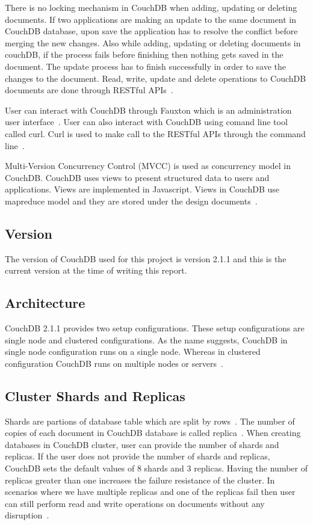 There is no locking mechanism in CouchDB when adding,
updating or deleting documents. If two applications are making an
update to the same document in CouchDB database, upon save the
application has to resolve the conflict before merging the new
changes. Also while adding, updating or deleting documents in couchDB,
if the process fails before finishing then nothing gets saved in the
document. The update process has to finish successfully in order to
save the changes to the document. Read, write, update and delete
operations to CouchDB documents are done through RESTful
APIs~\cite{www-Couchdb}. 

User can interact with CouchDB through Fauxton which is
an administration user interface~\cite{www-Couchdb}. User can also
interact with CouchDB using  comand line tool called curl. Curl is
used to make call to the RESTful APIs through the command
line~\cite{www-CouchdbCurl}. 


Multi-Version Concurrency Control (MVCC) is used as concurrency model
in CouchDB. CouchDB uses views to present structured data to users and
applications. Views are implemented in Javascript. Views in CouchDB
use mapreduce model and they are stored under the design
documents~\cite{www-Couchdb}.  

\subsection{Version}
The version of CouchDB used for this project is version 2.1.1 and this
is the current version at the time of writing this report.

\subsection{Architecture}
CouchDB 2.1.1 provides two setup configurations. These setup
configurations are single node and clustered configurations. As the
name suggests, CouchDB in single node configuration runs on a single
node. Whereas in clustered configuration CouchDB runs on multiple
nodes or servers~\cite{www-Couchdb, www-CouchdbOverview}.

\subsection{Cluster Shards and Replicas}

Shards are partions of database table which are split by
rows~\cite{www-WikiShard}. The number of copies of each document in
CouchDB database is called replica~\cite{www-CouchdbTheory}. When
creating databases in CouchDB cluster, user can provide the number of
shards and replicas. If the user does not provide the number of shards
and replicas, CouchDB sets the default values of 8 shards and 3
replicas. Having the number of replicas
greater than one increases the failure resistance of the cluster. In
scenarios where we have multiple replicas and one of the replicas fail
then user can still perform read and write operations on documents
without any disruption~\cite{www-CouchdbTheory}.

